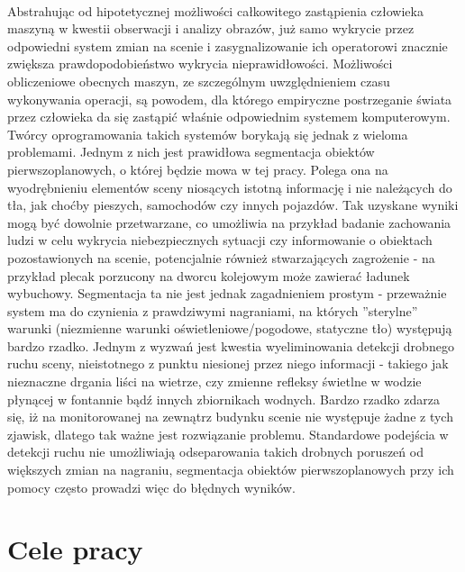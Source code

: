 \paragraph{}
Abstrahując od hipotetycznej możliwości całkowitego zastąpienia człowieka maszyną w kwestii obserwacji i analizy obrazów, już samo wykrycie przez odpowiedni system zmian na scenie i zasygnalizowanie ich operatorowi znacznie zwiększa prawdopodobieństwo wykrycia nieprawidłowości. Możliwości obliczeniowe obecnych maszyn, ze szczególnym uwzględnieniem czasu wykonywania operacji, są powodem, dla którego empiryczne postrzeganie świata przez człowieka da się zastąpić właśnie odpowiednim systemem komputerowym. Twórcy oprogramowania takich systemów borykają się jednak z wieloma problemami. Jednym z nich jest prawidłowa segmentacja obiektów pierwszoplanowych, o której będzie mowa w tej pracy. Polega ona na wyodrębnieniu elementów sceny niosących istotną informację i nie należących do tła, jak choćby pieszych, samochodów czy innych pojazdów. Tak uzyskane wyniki mogą być dowolnie przetwarzane, co umożliwia na przykład badanie zachowania ludzi w celu wykrycia niebezpiecznych sytuacji czy informowanie o obiektach pozostawionych na scenie, potencjalnie również stwarzających zagrożenie - na przykład plecak porzucony na dworcu kolejowym może zawierać ładunek wybuchowy. Segmentacja ta nie jest jednak zagadnieniem prostym - przeważnie system ma do czynienia z prawdziwymi nagraniami, na których ''sterylne'' warunki (niezmienne warunki oświetleniowe/pogodowe, statyczne tło) występują bardzo rzadko. Jednym z wyzwań jest kwestia wyeliminowania detekcji drobnego ruchu sceny, nieistotnego z punktu niesionej przez niego informacji - takiego jak nieznaczne drgania liści na wietrze, czy zmienne refleksy świetlne w wodzie płynącej w fontannie bądź innych zbiornikach wodnych. Bardzo rzadko zdarza się, iż na monitorowanej na zewnątrz budynku scenie nie występuje żadne z tych zjawisk, dlatego tak ważne jest rozwiązanie problemu. Standardowe podejścia w detekcji ruchu nie umożliwiają odseparowania takich drobnych poruszeń od większych zmian na nagraniu, segmentacja obiektów pierwszoplanowych przy ich pomocy często prowadzi więc do błędnych wyników.


\section{Cele pracy}
\label{sec:celePracy}


